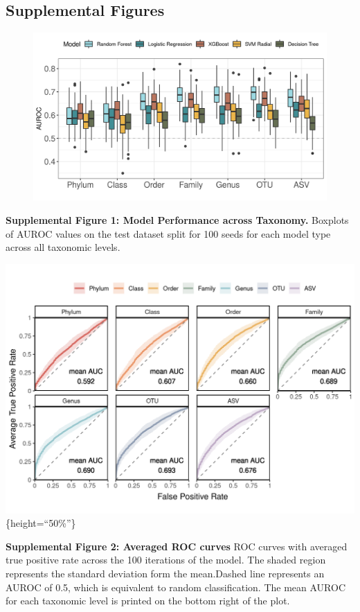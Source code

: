 \documentclass[]{article}
\begin{document}
\subsection{Supplemental Figures}\label{supplemental-figures}

\begin{figure}[htbp]
\centering
\includegraphics{figure_s1.png}
\end{figure}

\textbf{Supplemental Figure 1: Model Performance across Taxonomy.}
Boxplots of AUROC values on the test dataset split for 100 seeds for
each model type across all taxonomic levels.

\newpage

\includegraphics{figure_s2.png}\{height=``50\%''\}

\textbf{Supplemental Figure 2: Averaged ROC curves} ROC curves with
averaged true positive rate across the 100 iterations of the model. The
shaded region represents the standard deviation form the mean.Dashed
line represents an AUROC of 0.5, which is equivalent to random
classification. The mean AUROC for each taxonomic level is printed on
the bottom right of the plot.
\end{document}
